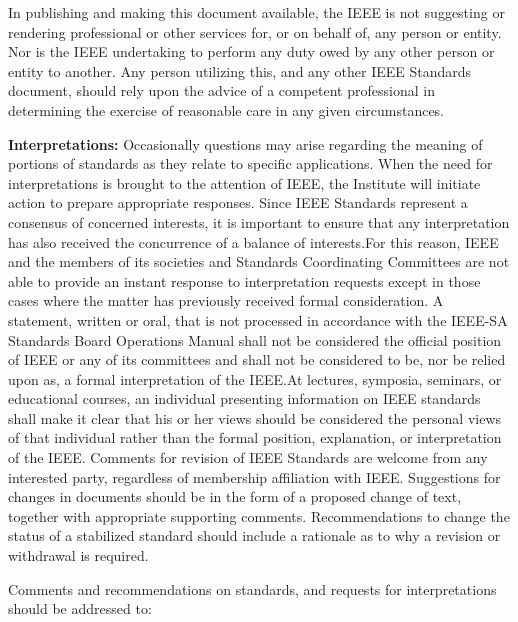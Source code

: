 {\vspace{11.5pt}
In publishing and making this document available, the IEEE is not suggesting or rendering professional or other services for, or on behalf of, any person or entity. Nor is the IEEE undertaking to perform any duty owed by any other person or entity to another. Any person utilizing this, and any other IEEE Standards document, should rely upon the advice of a competent professional in determining the exercise of reasonable care in any given circumstances.\par
\vspace{11.5pt}
\textbf{Interpretations:} Occasionally questions may arise regarding the meaning of portions of standards as they relate to specific applications. When the need for interpretations is brought to the attention of IEEE, the Institute will initiate action to prepare appropriate responses. Since IEEE Standards represent a consensus of concerned interests, it is important to ensure that any interpretation has also received the concurrence of a balance of interests.For this reason, IEEE and the members of its societies and Standards Coordinating Committees are not able to provide an instant response to interpretation requests except in those cases where the matter has previously received formal consideration. A statement, written or oral, that is not processed in accordance with the IEEE-SA Standards Board Operations Manual shall not be considered the official position of IEEE or any of its committees and shall not be considered to be, nor be relied upon as, a formal interpretation of the IEEE.At lectures, symposia, seminars, or educational courses, an individual presenting information on IEEE standards shall make it clear that his or her views should be considered the personal views of that individual rather than the formal position, explanation, or interpretation of the IEEE. Comments for revision of IEEE Standards are welcome from any interested party, regardless of membership affiliation with IEEE. Suggestions for changes in documents should be in the form of a proposed change of text, together with appropriate supporting comments. Recommendations to change the status of a stabilized standard should include a rationale as to why a revision or withdrawal is required.\par
\vspace{11.5pt}
Comments and recommendations on standards, and requests for interpretations should be addressed to:\par
\vspace{8pt}
}
